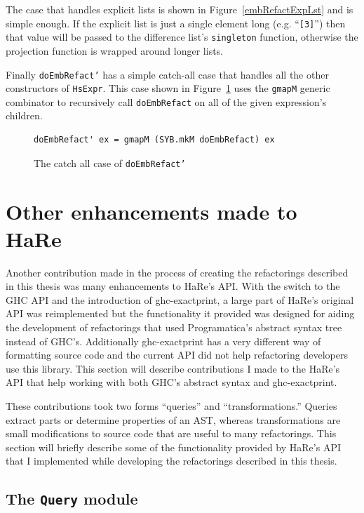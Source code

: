 The case that handles explicit lists is shown in Figure~\ref{embRefactExpLst} and is simple enough. If the explicit list is just a single element long (e.g. ``\texttt{[3]}'') then that value will be passed to the difference list's \texttt{singleton} function, otherwise the projection function is wrapped around longer lists. 

Finally \texttt{doEmbRefact'} has a simple catch-all case that handles all the other constructors of \texttt{HsExpr}. This case shown in Figure~\ref{doEmbCatchAll} uses the \texttt{gmapM} generic combinator to recursively call \texttt{doEmbRefact} on all of the given expression's children. 

\begin{figure}[t]
\begin{lstlisting}
doEmbRefact' ex = gmapM (SYB.mkM doEmbRefact) ex
\end{lstlisting}
\caption{The catch all case of \texttt{doEmbRefact'}}
\label{doEmbCatchAll}
\end{figure}

\section{Other enhancements made to HaRe}
\label{hareAPI}

Another contribution made in the process of creating the refactorings described in this thesis was many enhancements to HaRe's API. With the switch to the GHC API and the introduction of ghc-exactprint, a large part of HaRe's original API was reimplemented but the functionality it provided was designed for aiding the development of refactorings that used Programatica's abstract syntax tree instead of GHC's. Additionally ghc-exactprint has a very different way of formatting source code and the current API did not help refactoring developers use this library. This section will describe contributions I made to the HaRe's API that help working with both GHC's abstract syntax and ghc-exactprint.

These contributions took two forms ``queries'' and ``transformations.'' Queries extract parts or determine properties of an AST, whereas transformations are small modifications to source code that are useful to many refactorings. This section will briefly describe some of the functionality provided by HaRe's API that I implemented while developing the refactorings described in this thesis. 

\subsection{The \texttt{Query} module}

